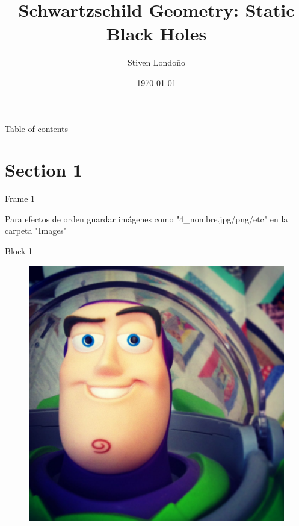 \documentclass[xcolor=dvipsnames]{beamer}
\title[Schwartzschild geometry]{Schwartzschild Geometry: Static Black Holes}
\date{\today}
\author[Universidad del Valle]{Stiven Londoño}
\institute[]{Universidad del Valle \\ Departamento de física}
\begin{document}
	
	\begin{frame}
		\titlepage
	\end{frame}
	
	\begin{frame}{Table of contents}
    \tableofcontents
	\end{frame}
	
	
\section{Section 1}

\begin{frame}{Frame 1}

Para efectos de orden guardar imágenes como "4\_nombre.jpg/png/etc" en la carpeta "Images"

\begin{block}{Block 1}
\cite{hobson_efstathiou_lasenby_2006}    
\end{block}

\begin{figure}
    \centering
    \includegraphics[width=0.25 \textwidth]{Presentations/Images/sample.jpg}
\end{figure}
    
\end{frame}
\end{document}
